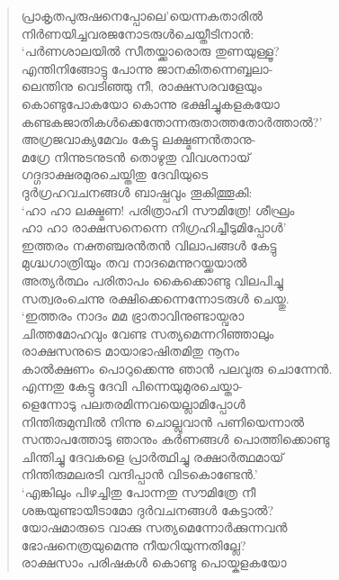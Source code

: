 \begin{verse}
പ്രാകൃതപുരുഷനെപ്പോലെ’യെന്നകതാരില്‍\\
നിര്‍ണയിച്ചവരജനോടരുള്‍ചെയ്തീടിനാന്‍:\\
‘പര്‍ണശാലയില്‍ സീതയ്ക്കാരൊരു തുണയുള്ളൂ?\\
എന്തിനിങ്ങോട്ടു പോന്നു ജാനകിതന്നെബ്ബലാ-\\
ലെന്തിനു വെടിഞ്ഞു നീ, രാക്ഷസരവളേയും\\
കൊണ്ടുപോകയോ കൊന്നു ഭക്ഷിച്ചുകളകയോ\\
കണ്ടകജാതികള്‍ക്കെന്തോന്നരുതാത്തതോര്‍ത്താല്‍?’\\
അഗ്രജവാക്യമേവം കേട്ടു ലക്ഷ്മണന്‍താനു-\\
മഗ്രേ നിന്നുടനുടന്‍ തൊഴുതു വിവശനായ്\\
ഗദ്ഗദാക്ഷരമുരചെയ്തിതു ദേവിയുടെ\\
ദുര്‍ഗ്രഹവചനങ്ങള്‍ ബാഷ്പവും തൂകിത്തൂകി:\\
‘ഹാ ഹാ ലക്ഷ്മണ! പരിത്രാഹി സൗമിത്രേ! ശീഘ്രം\\
ഹാ ഹാ രാക്ഷസനെന്നെ നിഗ്രഹിച്ചീടുമിപ്പോള്‍’\\
ഇത്തരം നക്തഞ്ചരന്‍തന്‍ വിലാപങ്ങള്‍ കേട്ടു\\
മുഗ്ദ്ധഗാത്രിയും തവ നാദമെന്നുറയ്ക്കയാല്‍\\
അത്യര്‍ത്ഥം പരിതാപം കൈക്കൊണ്ടു വിലപിച്ചു\\
സത്വരംചെന്നു രക്ഷിക്കെന്നെന്നോടരുള്‍ ചെയ്തു.\\
‘ഇത്തരം നാദം മമ ഭ്രാതാവിനുണ്ടായ്വരാ\\
ചിത്തമോഹവും വേണ്ട സത്യമെന്നറിഞ്ഞാലും\\
രാക്ഷസനുടെ മായാഭാഷിതമിതു നൂനം\\
കാല്‍ക്ഷണം പൊറുക്കെന്നു ഞാന്‍ പലവുരു ചൊന്നേന്‍.\\
എന്നതു കേട്ടു ദേവി പിന്നെയുമുരചെയ്താ-\\
ളെന്നോടു പലതരമിന്നവയെല്ലാമിപ്പോള്‍\\
നിന്തിരുമുമ്പില്‍ നിന്നു ചൊല്ലുവാന്‍ പണിയെന്നാല്‍\\
സന്താപത്തോടു ഞാനും കര്‍ണങ്ങള്‍ പൊത്തിക്കൊണ്ടു\\
ചിന്തിച്ചു ദേവകളെ പ്രാര്‍ത്ഥിച്ചു രക്ഷാര്‍ത്ഥമായ്\\
നിന്തിരുമലരടി വന്ദിപ്പാന്‍ വിടകൊണ്ടേന്‍.’\\
‘എങ്കിലും പിഴച്ചിതു പോന്നതു സൗമിത്രേ നീ\\
ശങ്കയുണ്ടായീടാമോ ദുര്‍വചനങ്ങള്‍ കേട്ടാല്‍?\\
യോഷമാരുടെ വാക്കു സത്യമെന്നോര്‍ക്കുന്നവന്‍\\
ഭോഷനെത്രയുമെന്നു നീയറിയുന്നതില്ലേ?\\
രാക്ഷസാം പരിഷകള്‍ കൊണ്ടു പൊയ്കളകയോ\\

\end{verse}
